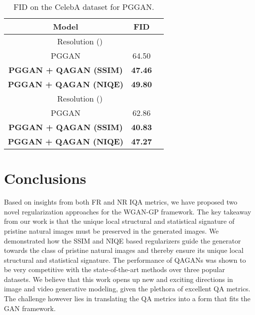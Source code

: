 \documentclass{article}
\begin{document}
\begin{table}[htbp]
\begin{center}
 \caption{FID on the CelebA dataset for PGGAN.}
 \label{tab:celeba_pggan}


  \begin{tabular}{|c|c|c|}
\hline
      {\bf{Model}} & {\bf{FID}} 

      \\
      \hline
        \multicolumn{2}{|c|}{{Resolution ()}}\\
\hline
     
     PGGAN \cite{karras2018progressive} &   {64.50} \\

      \hline
     
     \textbf{PGGAN + QAGAN (SSIM)} &   \textbf{47.46} \\\hline
     \textbf{PGGAN + QAGAN (NIQE)} &   \textbf{49.80}\\\hline
      \multicolumn{2}{|c|}{{Resolution ()}} \\
     \hline
     {PGGAN \cite{karras2018progressive}} &   {62.86} \\

      \hline
     
     \textbf{PGGAN + QAGAN (SSIM)} &   \textbf{40.83} \\\hline
     \textbf{PGGAN + QAGAN (NIQE)} &   \textbf{47.27}\\\hline
     
  \end{tabular}
\end{center}
\end{table}

\section{Conclusions}
Based on insights from both FR and NR IQA metrics, we have proposed two novel regularization approaches for the WGAN-GP framework. The key takeaway from our work is that the unique local structural and statistical signature of pristine natural images must be preserved in the generated images. We demonstrated how the SSIM and NIQE based regularizers guide the generator towards the class of pristine natural images and thereby ensure its unique local structural and statistical signature. The performance of QAGANs was shown to be very competitive with the state-of-the-art methods over three popular datasets. We believe that this work opens up new and exciting directions in image and video generative modeling, given the plethora of excellent QA metrics. The challenge however lies in translating the QA metrics into a form that fits the GAN framework.
\end{document}
